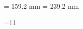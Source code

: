 
\immediate\message{\string\hsize=159.2 mm \string\vsize=239.2 mm}

\hsize= 159.2 mm
\vsize= 239.2 mm

{=11                          %

\gdef\m@g{\mag\count@
  \hsize=159.2truemm \vsize=239.2truemm \dimen\footins8truein}

}
